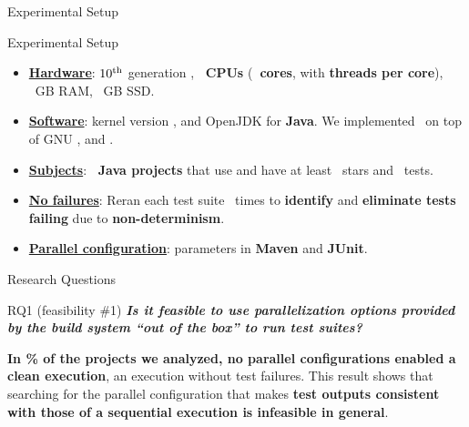 \documentclass{beamer}
\begin{document}
\begingroup
\renewcommand{\disp}{}
\begin{frame}
	\begin{center}
		Experimental Setup
	\end{center}
\end{frame}
\endgroup
\addtocounter{framenumber}{-1}

\begin{frame}{Experimental Setup}
\begin{itemize}
	\item{\textbf{\underline{Hardware}}: $10^{\textnormal{th}}$ generation \Processor, \textbf{\rsm \NumCPUs\ CPUs} (\textbf{\rsm \NumCores\ cores}, with \textbf{ threads per core}), \RAMCapacity\ GB RAM, \HardDiskCapacity\ GB SSD.}\pause
	\item{\textbf{\underline{Software}}: \textbf{} kernel version \KernelVersion, and OpenJDK \JavaVersion{} for \textbf{\rsm Java}. We implemented \tname\ on top of GNU \textbf{} \BashVersion, and \textbf{} \MavenVersion.}\pause
	\item{\textbf{\underline{Subjects}}: \textbf{\rsm \NumProjects\ Java projects} that use \textbf{} and have at least \NumStars\ stars and \NumTests\ tests.}\pause
	\item{\textbf{\underline{No failures}}: Reran each test suite \NumRepeatsManifest\ times to \textbf{\rsm identify} and \textbf{\rsm eliminate tests failing} due to \textbf{\rsm non-determinism}.}\pause
	\item{\textbf{\underline{Parallel configuration}}: parameters in \textbf{\rsm Maven} and \textbf{\rsm JUnit}.}
\end{itemize}
\end{frame}

\begingroup
\renewcommand{\disp}{}
\begin{frame}
	\begin{center}
		Research Questions
	\end{center}
\end{frame}
\endgroup
\addtocounter{framenumber}{-1}

\begin{frame}{RQ1 (feasibility \#1)}
\textbf{\textit{Is it feasible to use parallelization options provided by the build system ``out of the box'' to run test suites?}}\pause
\begin{center}
	\begin{tcolorbox}
		{\color{red} \textbf{In \NumProjectsParExecFailsPercentage\% of the projects we analyzed, no parallel configurations enabled a clean execution}}, \ie{} an execution without test failures. This result shows that searching for the parallel configuration that makes \textbf{\color{red}test outputs consistent with those of a sequential execution is infeasible in general}.
	\end{tcolorbox}
\end{center}
\end{frame}
\end{document}
